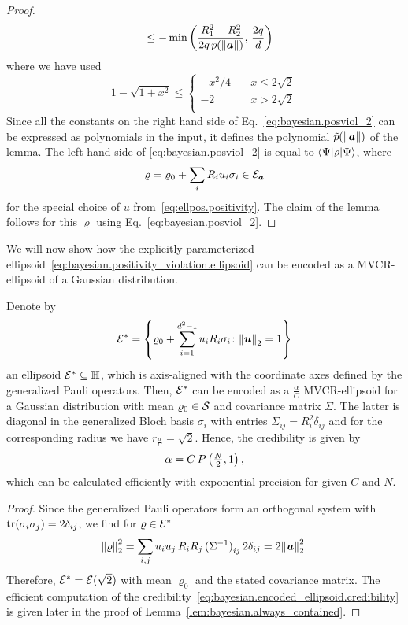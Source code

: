 \begin{proof}
\begin{align}
    &&\le - \min \left( \frac{R_1^2 - R_2^2}{2 q \, p({\Vert{\boldsymbol{a}}\Vert})},\, \frac{2q}{d} \right)
    \label{eq:bayesian.posviol_2}
  \end{align}
  where we have used
  \[
    1 - \sqrt{1 + x^2} \le
    \left\{
      \begin{array}{ll}
        -x^2 / 4 \quad &  x \le 2 \sqrt{2} \\
       -2 & x > 2 \sqrt{2} \\
      \end{array}
    \right.
  \]
  Since all the constants on the right hand side of Eq.~\eqref{eq:bayesian.posviol_2} can be expressed as polynomials in the input, it defines the polynomial $\tilde p({\Vert{\boldsymbol{a}}\Vert})$ of the lemma.
  The left hand side of \cref{eq:bayesian.posviol_2} is equal to $\bra\Psi \varrho \ket\Psi$, where
  \[
    \varrho = \varrho_0 + \sum_i R_i u_i \sigma_i \in \mathcal{E}_{{\boldsymbol{a}}}
  \]
  for the special choice of $u$ from~\eqref{eq:ellpos.positivity}.
  The claim of the lemma follows for this $\varrho$ using Eq.~\eqref{eq:bayesian.posviol_2}.
\end{proof}

We will now show how the explicitly parameterized ellipsoid~\eqref{eq:bayesian.positivity_violation.ellipsoid} can be encoded as a MVCR-ellipsoid of a Gaussian distribution.

\begin{lemma}\label{lem:bayesian.encoded_ellipsoid}
  Denote by
  \[
   \mathcal{E}^* = \left\{ \varrho_0 + \sum_{i=1}^{d^2 - 1} u_i R_i \sigma_i \colon {\Vert{\boldsymbol{u}}\Vert}_2 = 1 \right\}
  \]
  an ellipsoid $\mathcal{E}^* \subseteq \mathbb{H}$, which is axis-aligned with the coordinate axes defined by the generalized Pauli operators.
  Then, $\mathcal{E}^*$ can be encoded as a $\frac{\alpha}{C}$ MVCR-ellipsoid for a Gaussian distribution with mean $\varrho_0 \in \mathcal{S}$ and covariance matrix $\Sigma$.
  The latter is diagonal in the generalized Bloch basis $\sigma_i$ with entries $\Sigma_{ij} = R_i^2 \delta_{ij}$ and for the corresponding radius we have $r_\frac{\alpha}{C} = \sqrt{2}$.
  Hence, the credibility is given by
  \[
    \label{eq:bayesian.encoded_ellipsoid.credibility}
    \alpha = C\, P\left(\tfrac{N}{2}, 1\right),
  \]
  which can be calculated efficiently with exponential precision for given $C$ and $N$.
 \end{lemma}
 \begin{proof}
   Since the generalized Pauli operators form an orthogonal system with $\operatorname{tr} (\sigma_i\sigma_j) = 2 \delta_{ij}$, we find for $\varrho \in \mathcal{E}^*$
   \[
      {\Vert\varrho\Vert}^2_2 = \sum_{i,j} u_i u_j \, R_i R_j \, {(\Sigma^{-1})}_{ij} \, 2 \delta_{ij} = 2 {\Vert{\boldsymbol{u}}\Vert}_2^2.
   \]
   Therefore, $\mathcal{E}^* = \mathcal{E}(\sqrt{2})$ with mean $\varrho_0$ and the stated covariance matrix.
   The efficient computation of the credibility~\eqref{eq:bayesian.encoded_ellipsoid.credibility} is given later in the proof of Lemma~\ref{lem:bayesian.always_contained}.
 \end{proof}


